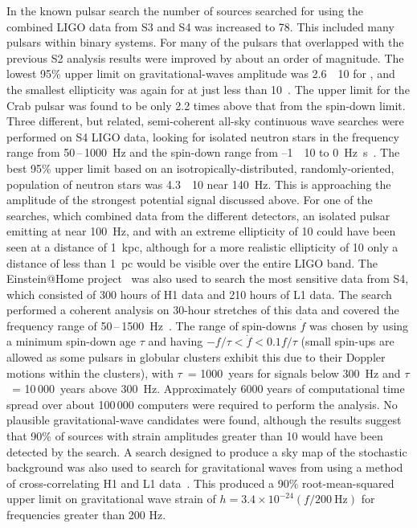 In the known pulsar search the number of sources searched for using the combined
LIGO data from S3 and S4 was increased to 78. This included many pulsars within
binary systems. For many of the pulsars that overlapped with the previous S2
analysis results were improved by about an order of magnitude. The lowest 95\%
upper limit on gravitational-waves amplitude was 2.6~\texttimes~10 for
, and the smallest ellipticity was again for 
at just less than 10~\cite{Abbott:2007d}. The upper limit for the Crab
pulsar was found to be only 2.2 times above that from the spin-down limit. Three
different, but related, semi-coherent all-sky continuous wave searches were
performed on S4 LIGO data, looking for isolated neutron stars in the frequency
range from 50\,--\,1000~Hz and the spin-down range from --1~\texttimes~10
to 0~Hz~s~\cite{Abbott:2008e}. The best 95\% upper limit based on an
isotropically-distributed, randomly-oriented, population of neutron stars was
4.3~\texttimes~10 near 140~Hz. This is approaching the amplitude of the
strongest potential signal discussed above. For one of the searches, which
combined data from the different detectors, an isolated pulsar emitting at near
100~Hz, and with an extreme ellipticity of 10 could have been seen at a
distance of 1~kpc, although for a more realistic ellipticity of 10 only
a distance of less than 1~pc would be visible over the entire LIGO band. The
Einstein@Home project~\cite{eath} was also used to search the most sensitive
data from S4, which consisted of 300 hours of H1 data and 210 hours of L1 data.
The search performed a coherent analysis on 30-hour stretches of this data and
covered the frequency range of 50\,--\,1500~Hz~\cite{Abbott:2008f}. The range
of spin-downs $\dot{f}$ was chosen by using a minimum spin-down age $\tau$ and
having $-f/\tau < \dot{f} < 0.1f/\tau$ (small spin-ups are allowed as some
pulsars in globular clusters exhibit this due to their Doppler motions within
the clusters), with $\tau$~= 1000~years for signals below 300~Hz and
$\tau$~= 10\,000~years above 300~Hz. Approximately 6000 years of computational time
spread over about 100\,000 computers were required to perform the analysis. No
plausible gravitational-wave candidates were found, although the results suggest
that 90\% of sources with strain amplitudes greater than 10 would have
been detected by the search. A search designed to produce a sky map of the
stochastic background was also used to search for gravitational waves from
 using a method of cross-correlating H1 and L1 data~\cite{Abbott:2007f}.
This produced a 90\% root-mean-squared upper limit on gravitational wave strain
of $h = 3.4\times10^{-24}(f/200 \mathrm{\ Hz})$ for frequencies greater than 200 Hz.


